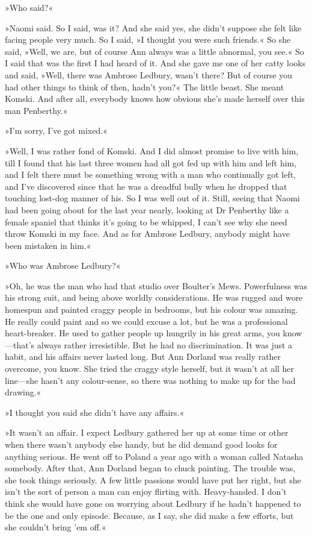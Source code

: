 »Who said?«

»Naomi said. So I said, was it? And she said yes, she didn't suppose she felt like facing people very much. So I said, »I thought you were such friends.« So she said, »Well, we are, but of course Ann always was a little abnormal, you see.« So I said that was the first I had heard of it. And she gave me one of her catty looks and said, »Well, there was Ambrose Ledbury, wasn't there? But of course you had other things to think of then, hadn't you?« The little beast. She meant Komski. And after all, everybody knows how obvious she's made herself over this man Penberthy.«

»I'm sorry, I've got mixed.«

»Well, I was rather fond of Komski. And I did almost promise to live with him, till I found that his last three women had all got fed up with him and left him, and I felt there must be something wrong with a man who continually got left, and I've discovered since that he was a dreadful bully when he dropped that touching lost-dog manner of his. So I was well out of it. Still, seeing that Naomi had been going about for the last year nearly, looking at Dr Penberthy like a female spaniel that thinks it's going to be whipped, I can't see why she need throw Komski in my face. And as for Ambrose Ledbury, anybody might have been mistaken in him.«

»Who was Ambrose Ledbury?«

»Oh, he was the man who had that studio over Boulter's Mews. Powerfulness was his strong suit, and being above worldly considerations. He was rugged and wore homespun and painted craggy people in bedrooms, but his colour was amazing. He really could paint and so we could excuse a lot, but he was a professional heart-breaker. He used to gather people up hungrily in his great arms, you know\allowbreak---\allowbreak that's always rather irresistible. But he had no discrimination. It was just a habit, and his affairs never lasted long. But Ann Dorland was really rather overcome, you know. She tried the craggy style herself, but it wasn't at all her line\allowbreak---\allowbreak she hasn't any colour-sense, so there was nothing to make up for the bad drawing.«

»I thought you said she didn't have any affairs.«

»It wasn't an affair. I expect Ledbury gathered her up at some time or other when there wasn't anybody else handy, but he did demand good looks for anything serious. He went off to Poland a year ago with a woman called Natasha somebody. After that, Ann Dorland began to chuck painting. The trouble was, she took things seriously. A few little passions would have put her right, but she isn't the sort of person a man can enjoy flirting with. Heavy-handed. I don't think she would have gone on worrying about Ledbury if he hadn't happened to be the one and only episode. Because, as I say, she did make a few efforts, but she couldn't bring 'em off.«


